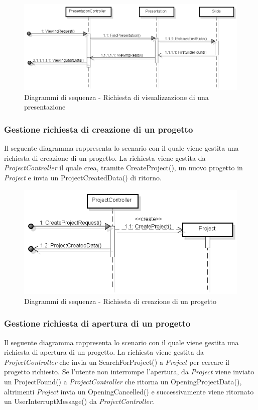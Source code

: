 	\begin{figure}[H]
		\centering
		\includegraphics[scale=0.5]{img/view.png}
		\caption{Diagrammi di sequenza - Richiesta di visualizzazione di una presentazione}
	\end{figure} 
	
	
	\subsubsection{Gestione richiesta di creazione di un progetto}
	Il seguente diagramma rappresenta lo scenario con il quale viene gestita una richiesta di creazione di un progetto. La richiesta viene gestita da \textit{ProjectController} il quale crea, tramite CreateProject(), un nuovo progetto in \textit{Project} e invia un ProjectCreatedData() di ritorno.
	
	\begin{figure}[H]
		\centering
		\includegraphics[scale=0.5]{img/create.png}
		\caption{Diagrammi di sequenza - Richiesta di creazione di un progetto}
	\end{figure}
	
	\subsubsection{Gestione richiesta di apertura di un progetto}
	Il seguente diagramma rappresenta lo scenario con il quale viene gestita una richiesta di apertura di un progetto. La richiesta viene gestita da \textit{ProjectController} che invia un SearchForProject() a \textit{Project} per cercare il progetto richiesto. Se l'utente non interrompe l'apertura, da \textit{Project} viene inviato un ProjectFound() a \textit{ProjectController} che ritorna un OpeningProjectData(), altrimenti \textit{Project} invia un OpeningCancelled() e successivamente viene ritornato un UserInterruptMessage() da \textit{ProjectController}.
	
